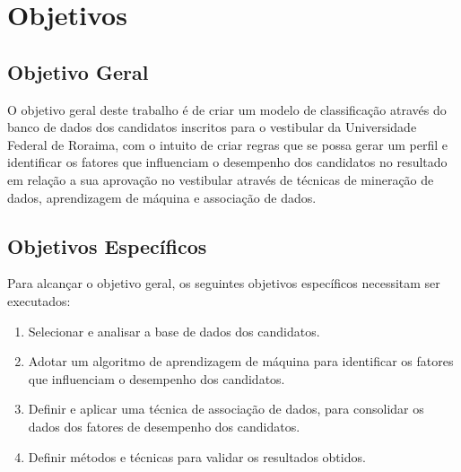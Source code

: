 \section{Objetivos}

\subsection{Objetivo Geral}

O objetivo geral deste trabalho é de criar um modelo de classificação através do banco de dados dos candidatos inscritos para o vestibular da Universidade Federal de Roraima, com o intuito de criar regras que se possa gerar um perfil e identificar os fatores que influenciam o desempenho dos candidatos no resultado em relação a sua aprovação no vestibular através de técnicas de mineração de dados, aprendizagem de máquina e associação de dados.


\subsection{Objetivos Específicos}

Para alcançar o objetivo geral, os seguintes objetivos específicos necessitam ser executados:


\begin{enumerate}
  \item Selecionar e analisar a base de dados dos candidatos.
  \item Adotar um algoritmo de aprendizagem de máquina para identificar os fatores que influenciam o desempenho dos candidatos.
  \item Definir e aplicar uma técnica de associação de dados, para consolidar os dados dos fatores de desempenho dos candidatos.
  \item Definir métodos e técnicas para validar os resultados obtidos.
\end{enumerate}



